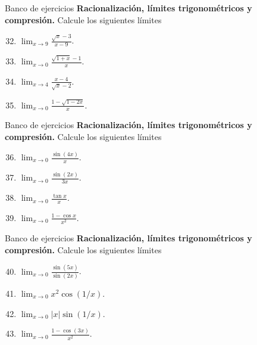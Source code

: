 \documentclass[12pt,aspectratio=169]{beamer}
\begin{document}
\begin{frame}[t,allowframebreaks]{Banco de ejercicios}
\small
\noindent \textbf{Racionalización, límites trigonométricos y compresión.} Calcule los siguientes l\'imites\par\smallskip
\begin{enumerate}\setcounter{enumi}{31}
\item $\displaystyle\lim_{x\to9}\frac{\sqrt{x}-3}{x-9}$.
\item $\displaystyle\lim_{x\to0}\frac{\sqrt{1+x}-1}{x}$.
\item $\displaystyle\lim_{x\to4}\frac{x-4}{\sqrt{x}-2}$.
\item $\displaystyle\lim_{x\to0}\frac{1-\sqrt{1-2x}}{x}$.
\end{enumerate}
\end{frame}


\begin{frame}[t,allowframebreaks]{Banco de ejercicios}
\small
\noindent \textbf{Racionalización, límites trigonométricos y compresión.} Calcule los siguientes l\'imites\par\smallskip
\begin{enumerate}\setcounter{enumi}{35}
\item $\displaystyle\lim_{x\to0}\frac{\sin(4x)}{x}$.
\item $\displaystyle\lim_{x\to0}\frac{\sin(2x)}{3x}$.
\item $\displaystyle\lim_{x\to0}\frac{\tan x}{x}$.
\item $\displaystyle\lim_{x\to0}\frac{1-\cos x}{x^2}$.
\end{enumerate}
\end{frame}


\begin{frame}[t,allowframebreaks]{Banco de ejercicios}
\small
\noindent \textbf{Racionalización, límites trigonométricos y compresión.} Calcule los siguientes l\'imites\par\smallskip
\begin{enumerate}\setcounter{enumi}{39}
\item $\displaystyle\lim_{x\to0}\frac{\sin(5x)}{\sin(2x)}$.
\item $\displaystyle\lim_{x\to0}x^2\cos(1/x)$.
\item $\displaystyle\lim_{x\to0}|x|\sin(1/x)$.
\item $\displaystyle\lim_{x\to0}\frac{1-\cos(3x)}{x^2}$.
\end{enumerate}
\end{frame}
\end{document}
